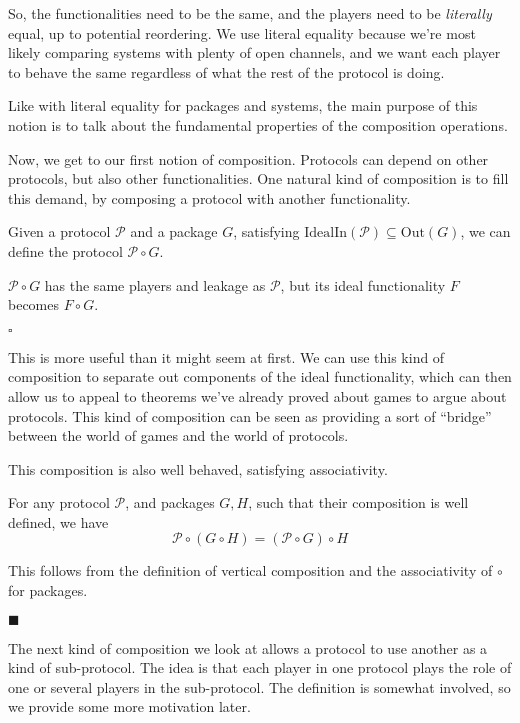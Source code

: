 So, the functionalities need to be the same,
and the players need to be \emph{literally} equal,
up to potential reordering.
We use literal equality because we're most likely
comparing systems with plenty of open channels,
and we want each player to behave the same regardless of what
the rest of the protocol is doing.

Like with literal equality for packages and systems, the main purpose
of this notion is to talk about the fundamental properties
of the composition operations.

Now, we get to our first notion of composition.
Protocols can depend on other protocols, but also other functionalities.
One natural kind of composition is to fill this demand,
by composing a protocol with another functionality.

\begin{definition}
Given a protocol $\mathscr{P}$ and a package $G$, satisfying
$\text{IdealIn}(\mathscr{P}) \subseteq \text{Out}(G)$,
we can define the protocol $\mathscr{P} \circ G$.

$\mathscr{P} \circ G$ has the same players and leakage as $\mathscr{P}$,
but its ideal functionality $F$ becomes $F \circ G$.

$\square$
\end{definition}

This is more useful than it might seem at first.
We can use this kind of composition to separate out components
of the ideal functionality, which can then allow us to appeal
to theorems we've already proved about games to argue
about protocols.
This kind of composition can be seen as providing a
sort of ``bridge'' between the world of games and the world of protocols.

This composition is also well behaved, satisfying associativity.

\begin{claim}
For any protocol $\mathscr{P}$, and packages $G, H$, such that their composition
is well defined, we have
$$
\mathscr{P} \circ (G \circ H) = (\mathscr{P} \circ G) \circ H
$$

 This follows from the definition of vertical composition
and the associativity of $\circ$ for packages.

$\blacksquare$
\end{claim}

The next kind of composition we look at allows a protocol
to use another as a kind of sub-protocol.
The idea is that each player in one protocol plays the role
of one or several players in the sub-protocol.
The definition is somewhat involved, so we provide some more motivation
later.

